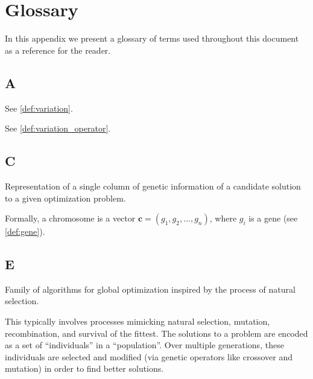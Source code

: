 \chapter{Glossary}
\label{appendix:glossary}
  In this appendix we present a glossary of terms used throughout this document as a reference for
  the reader.

  \section*{A}
    \begin{definition}[Alteration]
    \label{def:alteration}
      See \vref{def:variation}.
    \end{definition}

    \begin{definition}[Alterer]
    \label{def:alterer}
      See \vref{def:variation_operator}.
    \end{definition}

  \section*{C}
    \begin{definition}[Chromosome]
    \label{def:chromosome}
      Representation of a single column of genetic information of a candidate solution to a given
      optimization problem.

      Formally, a chromosome is a vector \(\textbf{c} = (g_1, g_2, \dots, g_n)\), where \(g_i\) is a
      gene (see \vref{def:gene}).
    \end{definition}

  \section*{E}
    \begin{definition}
    \label{def:evolutionary_computation}
      Family of algorithms for global optimization inspired by the process of natural selection.

      This typically involves processes mimicking natural selection, mutation, recombination, and 
      survival of the fittest. 
      The solutions to a problem are encoded as a set of \enquote{individuals} in a 
      \enquote{population}. 
      Over multiple generations, these individuals are selected and modified (via genetic operators 
      like crossover and mutation) in order to find better solutions.
    \end{definition}

